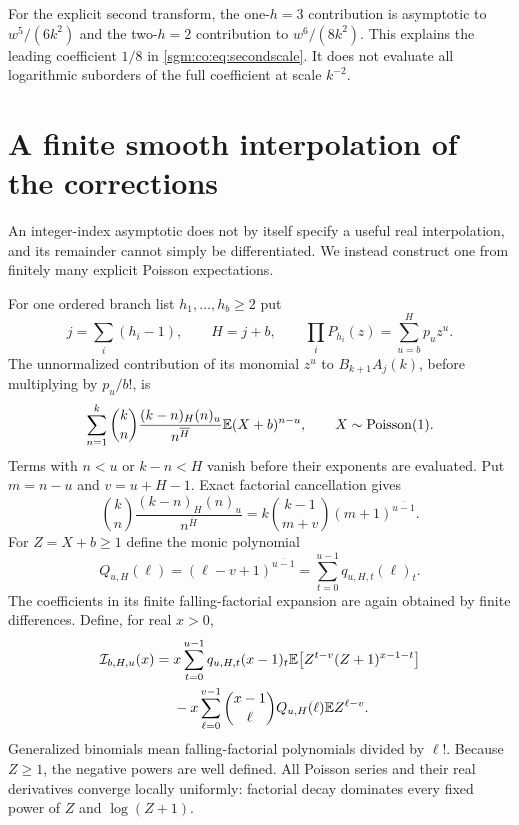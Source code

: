\documentclass[11pt,letterpaper]{article}
\theoremstyle{remark}\newtheorem{remark}[theorem]{Remark}
\newcommand{\Poi}{\operatorname{Poisson}}\newcommand{\Bin}{\operatorname{Bin}}
\theoremstyle{definition}\newtheorem{definition}[theorem]{Definition}
\begin{document}
For the explicit second transform, the one-$h=3$ contribution is asymptotic to $w^5/(6k^2)$ and the two-$h=2$ contribution to $w^6/(8k^2)$. This explains the leading coefficient $1/8$ in \eqref{sgm:co:eq:secondscale}. It does not evaluate all logarithmic suborders of the full coefficient at scale $k^{-2}$.

\section{A finite smooth interpolation of the corrections}\label{sgm:co:sec:interpolation}
An integer-index asymptotic does not by itself specify a useful real interpolation, and its remainder cannot simply be differentiated. We instead construct one from finitely many explicit Poisson expectations.

For one ordered branch list $h_1,\ldots,h_b\ge2$ put
\[
 j=\sum_i(h_i-1),\qquad H=j+b,\qquad
 \prod_iP_{h_i}(z)=\sum_{u=b}^H p_u z^u.
\]
The unnormalized contribution of its monomial $z^u$ to $B_{k+1}A_j(k)$, before multiplying by $p_u/b!$, is
\begin{equation}\label{sgm:co:eq:monomialtransform}
 \sum_{n=1}^k\binom kn\frac{(k-n)_H(n)_u}{n^{\overline H}}
       \E(X+b)^{n-u},\qquad X\sim\Poi(1).
\end{equation}
Terms with $n<u$ or $k-n<H$ vanish before their exponents are evaluated. Put $m=n-u$ and $v=u+H-1$. Exact factorial cancellation gives
\begin{equation}\label{sgm:co:eq:cancellation}
 \binom kn\frac{(k-n)_H(n)_u}{n^{\overline H}}
       =k\binom{k-1}{m+v}(m+1)^{\overline{u-1}}.
\end{equation}
For $Z=X+b\ge1$ define the monic polynomial
\[
 Q_{u,H}(\ell)=(\ell-v+1)^{\overline{u-1}}
       =\sum_{t=0}^{u-1}q_{u,H,t}(\ell)_t.
\]
The coefficients in its finite falling-factorial expansion are again obtained by finite differences. Define, for real $x>0$,
\begin{align}\label{sgm:co:eq:Ireal}
 \mathcal I_{b,H,u}(x)={}&x\sum_{t=0}^{u-1}q_{u,H,t}(x-1)_t
       \mathbb E\!\left[Z^{t-v}(Z+1)^{x-1-t}\right]\nonumber\\
 &-x\sum_{\ell=0}^{v-1}\binom{x-1}{\ell}Q_{u,H}(\ell)
                   \mathbb E Z^{\ell-v}.
\end{align}
Generalized binomials mean falling-factorial polynomials divided by $\ell!$. Because $Z\ge1$, the negative powers are well defined. All Poisson series and their real derivatives converge locally uniformly: factorial decay dominates every fixed power of $Z$ and $\log(Z+1)$.
\end{document}
